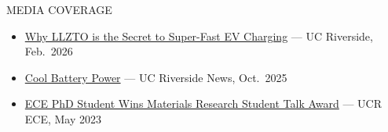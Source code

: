 \documentclass{resume}
\begin{document}
\begin{rSection}{MEDIA COVERAGE}
\begin{itemize}
\itemsep 0.05em
\item \href{https://www.youtube.com/watch?v=dPwabntYj9s}{Why LLZTO is the Secret to Super-Fast EV Charging} --- UC Riverside, Feb.\ 2026
\item \href{https://news.ucr.edu/articles/2025/10/22/cool-battery-power}{Cool Battery Power} --- UC Riverside News, Oct.\ 2025
\item \href{https://ece.ucr.edu/news/2023/05/10/ece-phd-student-wins-materials-research-student-talk-award}{ECE PhD Student Wins Materials Research Student Talk Award} --- UCR ECE, May 2023
\end{itemize}
\end{rSection}
\end{document}

